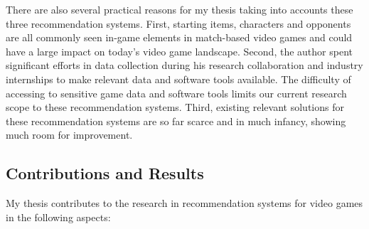 There are also several practical reasons for my thesis taking into accounts these three recommendation systems. First, starting items, characters and opponents are all commonly seen in-game elements in match-based video games and could have a large impact on today's video game landscape.  Second, the author spent significant efforts in data collection during his research collaboration and industry internships to make relevant data and software tools available. The difficulty of accessing to sensitive game data and software tools limits our current research scope to these recommendation systems. Third, existing relevant solutions for these recommendation systems are so far scarce and in much infancy, showing much room for improvement. 

\subsection{Contributions and Results}
My thesis contributes to the research in recommendation systems for video games in the following aspects:
